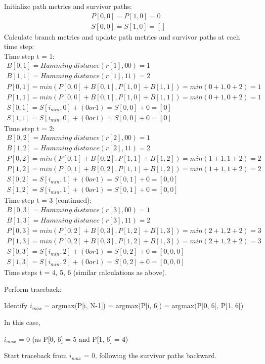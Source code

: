 Initialize path metrics and survivor paths:
\begin{align}
P[0, 0] = P[1, 0] = 0\\
S[0, 0] = S[1, 0] = []
\end{align}
Calculate branch metrics and update path metrics and survivor paths at each time step:\\
Time step t = 1:
\begin{align}
B[0, 1] = Hamming\; distance(r[1], 00) = 1\\
B[1, 1] = Hamming\; distance(r[1], 11) = 2\\
P[0, 1] = min(P[0, 0] + B[0, 1], P[1, 0] + B[1, 1]) = min(0 + 1, 0 + 2) = 1\\
P[1, 1] = min(P[0, 0] + B[0, 1], P[1, 0] + B[1, 1]) = min(0 + 1, 0 + 2) = 1\\
S[0, 1] = S[i_{min}, 0] + (0 or 1) = S[0, 0] + 0 = [0]\\
S[1, 1] = S[i_{min}, 0] + (0 or 1) = S[0, 0] + 0 = [0]
\end{align}
Time step t = 2:
\begin{align}
B[0, 2] = Hamming\; distance(r[2], 00) = 1\\
B[1, 2] = Hamming\; distance(r[2], 11) = 2\\
P[0, 2] = min(P[0, 1] + B[0, 2], P[1, 1] + B[1, 2]) = min(1 + 1, 1 + 2) = 2\\
P[1, 2] = min(P[0, 1] + B[0, 2], P[1, 1] + B[1, 2]) = min(1 + 1, 1 + 2) = 2\\
S[0, 2] = S[i_{min}, 1] + (0 or 1) = S[0, 1] + 0 = [0, 0]\\
S[1, 2] = S[i_{min}, 1] + (0 or 1) = S[0, 1] + 0 = [0, 0]
\end{align}
Time step t = 3 (continued):
\begin{align}
B[0, 3] = Hamming\; distance(r[3], 00) = 1\\
B[1, 3] = Hamming\; distance(r[3], 11) = 2\\
P[0, 3] = min(P[0, 2] + B[0, 3], P[1, 2] + B[1, 3]) = min(2 + 1, 2 + 2) = 3\\
P[1, 3] = min(P[0, 2] + B[0, 3], P[1, 2] + B[1, 3]) = min(2 + 1, 2 + 2) = 3\\
S[0, 3] = S[i_{min}, 2] + (0 or 1) = S[0, 2] + 0 = [0, 0, 0]\\
S[1, 3] = S[i_{min}, 2] + (0 or 1) = S[0, 2] + 0 = [0, 0, 0]
\end{align}
Time steps t = 4, 5, 6 (similar calculations as above).

Perform traceback:
\begin{center}
Identify 
$i_{max}$ = argmax(P[i, N-1]) = argmax(P[i, 6]) = argmax(P[0, 6], P[1, 6])
\end{center}
In this case,
\begin{center}
$i_{max}$ = 0 (as P[0, 6] = 5 and P[1, 6] = 4)
\end{center}
Start traceback from $i_{max}$ = 0, following the survivor paths backward.

